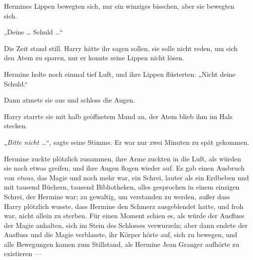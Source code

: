 Hermines Lippen bewegten sich, nur ein winziges bisschen, aber sie bewegten sich.

„Deine … Schuld …“

Die Zeit stand still. Harry hätte ihr sagen sollen, sie solle nicht reden, um sich den Atem zu sparen, nur er konnte seine Lippen nicht lösen.

Hermine holte noch einmal tief Luft, und ihre Lippen flüsterten:
„Nicht deine Schuld.“

Dann atmete sie aus und schloss die Augen.

Harry starrte sie mit halb geöffnetem Mund an, der Atem blieb ihm im Hals stecken.

„\emph{Bitte nicht …}“, sagte seine Stimme. Er war nur zwei Minuten zu spät gekommen.

Hermine zuckte plötzlich zusammen, ihre Arme zuckten in die Luft, als würden sie nach etwas greifen, und ihre Augen flogen wieder auf. Es gab einen Ausbruch von \emph{etwas}, das Magie und noch mehr war, ein Schrei, lauter als ein Erdbeben und mit tausend Büchern, tausend Bibliotheken, alles gesprochen in einem einzigen Schrei, der Hermine war; zu gewaltig, um verstanden zu werden, außer dass Harry plötzlich wusste, dass Hermine den Schmerz ausgeblendet hatte, und froh war, nicht allein zu sterben. Für einen Moment schien es, als würde der Ausfluss der Magie anhalten, sich im Stein des Schlosses verwurzeln; aber dann endete der Ausfluss und die Magie verblasste, ihr Körper hörte auf, sich zu bewegen, und alle Bewegungen kamen zum Stillstand, als Hermine Jean Granger aufhörte zu existieren —

